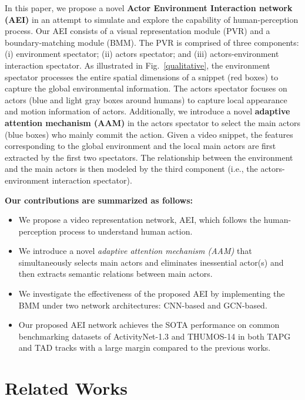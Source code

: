 \documentclass{bmvc2k}
\begin{document}
In this paper, we propose a novel \textbf{Actor Environment Interaction network (AEI)} in an attempt to simulate and explore the capability of human-perception process. Our AEI consists of a visual representation module (PVR) and a boundary-matching module (BMM). The PVR is comprised of three components: (i) environment spectator; (ii) actors spectator; and (iii) actors-environment interaction spectator. As illustrated in Fig.~\ref{qualitative}, the environment spectator processes the entire spatial dimensions of a snippet (red boxes) to capture the global environmental information. The actors spectator focuses on actors (blue and light gray boxes around humans) to capture local appearance and motion information of actors. Additionally, we introduce a novel \textbf{adaptive attention mechanism (AAM)} in the actors spectator to select the main actors (blue boxes) who mainly commit the action. Given a video snippet, the features corresponding to the global environment and the local main actors are first extracted by the first two spectators. The relationship between the environment and the main actors is then modeled by the third component (i.e., the actors-environment interaction spectator).





\textbf{Our contributions are summarized as follows:}
\begin{itemize}[leftmargin=*,noitemsep,topsep=-3pt] \item We propose a video representation network, AEI, which follows the human-perception process to understand human action.
    \item We introduce a novel \emph{adaptive attention mechanism (AAM)} that simultaneously selects main actors and eliminates inessential actor(s) and then extracts semantic relations between main actors.
    \item We investigate the effectiveness of the proposed AEI by implementing the BMM under two network architectures: CNN-based and GCN-based.
\item Our proposed AEI network achieves the SOTA performance on common benchmarking datasets of ActivityNet-1.3 and THUMOS-14 in both TAPG and TAD tracks with a large margin compared to the previous works.
\end{itemize}

\section{Related Works}
\end{document}
